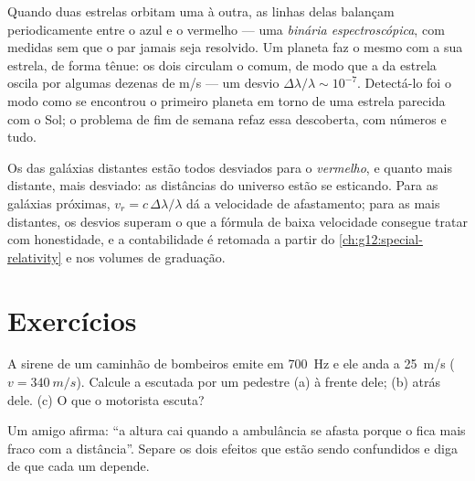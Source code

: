 \begin{example}\label{ex:g12:doppler-effect:wobble}
Quando duas estrelas orbitam uma à outra, as linhas delas balançam
periodicamente entre o azul e o vermelho --- uma \emph{binária
espectroscópica}, com  medidas sem
que o par jamais seja resolvido. Um planeta faz o mesmo com a sua
estrela, de forma tênue: os dois circulam o  comum, de
modo que a  da estrela oscila por algumas dezenas de
\unit{m/s} --- um desvio $\Delta\lambda/\lambda \sim 10^{-7}$. Detectá-lo
foi o modo como se encontrou o primeiro planeta em torno de uma estrela
parecida com o Sol; o problema de fim de semana refaz essa descoberta,
com números e tudo.
\end{example}

\begin{remark}\label{rem:g12:doppler-effect:expansion}
Os  das galáxias distantes estão todos desviados para o
\emph{vermelho}, e quanto mais distante, mais desviado: as distâncias do
universo estão se esticando. Para as galáxias próximas,
$v_r = c\,\Delta\lambda/\lambda$ dá a velocidade de afastamento; para as
mais distantes, os desvios superam o que a fórmula de baixa velocidade
consegue tratar com honestidade, e a contabilidade é retomada a partir do
\cref{ch:g12:special-relativity} e nos volumes de graduação.
\end{remark}

\section{Exercícios}

\begin{exercise}[$\star$]\label{exo:g12:doppler-effect:1}
A sirene de um caminhão de bombeiros emite em \qty{700}{Hz} e ele anda a
\qty{25}{m/s} ($v = \qty{340}{m/s}$). Calcule a  escutada por
um pedestre (a) à frente dele; (b) atrás dele. (c) O que o motorista
escuta?
\end{exercise}

\begin{exercise}[$\star$]\label{exo:g12:doppler-effect:2}
Um amigo afirma: ``a altura cai quando a ambulância se afasta porque o
 fica mais fraco com a distância''. Separe os dois efeitos que estão
sendo confundidos e diga de que cada um depende.
\end{exercise}

